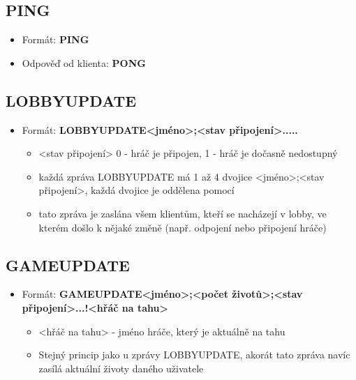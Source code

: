 \documentclass[12pt]{report}
\begin{document}
		\subsection{PING}
			\begin{itemize}
				\item Formát: \textbf{PING}
				\item Odpověď od klienta: \textbf{PONG}
			\end{itemize}
		\subsection{LOBBYUPDATE}
			\begin{itemize}
				\item Formát: \textbf{LOBBYUPDATE{\textbar}{\textless}jméno{\textgreater};{\textless}stav připojení{\textgreater}{\textbar}.....}
					\begin{itemize}
						\item {\textless}stav připojení{\textgreater} 0 - hráč je připojen, 1 - hráč je dočasně nedostupný
						\item každá zpráva LOBBYUPDATE má 1 až 4 dvojice {\textless}jméno{\textgreater};{\textless}stav připojení{\textgreater}, každá dvojice je oddělena pomocí {\textbar}
						\item tato zpráva je zaslána všem klientům, kteří se nacházejí v lobby, ve kterém došlo k nějaké změně (např. odpojení nebo připojení hráče)
					\end{itemize}
			\end{itemize}
		\subsection{GAMEUPDATE}
			\begin{itemize}
				\item Formát: \textbf{GAMEUPDATE{\textbar}{\textless}jméno{\textgreater};{\textless}počet životů{\textgreater};{\textless}stav připojení{\textgreater}{\textbar}...!{\textless}hřáč na tahu{\textgreater}}
				\begin{itemize}
					\item {\textless}hřáč na tahu{\textgreater} - jméno hráče, který je aktuálně na tahu
					\item Stejný princip jako u zprávy LOBBYUPDATE, akorát tato zpráva navíc zasílá aktuální životy daného uživatele
				\end{itemize}
			\end{itemize}
\end{document}
